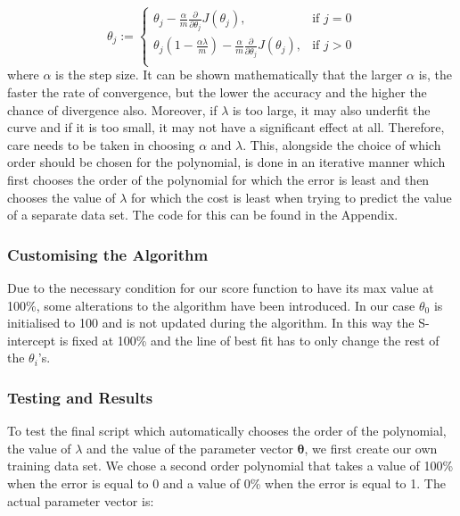 \documentclass[10pt,a4paper]{article}
\begin{document}
\begin{equation}
  \theta_j :=
\begin{cases}
\theta_j  - \frac{\alpha}{m} \frac{\partial}{\partial \theta_j } J( \theta_j), & \text{if }j = 0 \\
\theta_j \left(1- \frac{\alpha\lambda}{m} \right) - \frac{\alpha}{m} \frac{\partial}{\partial \theta_j } J( \theta_j), & \text{if }j > 0 \\
\end{cases}
\end{equation} 
where $\alpha$ is the step size. It can be shown mathematically that the larger $\alpha$ is, the faster the rate of convergence, but the lower the accuracy and the higher the chance of divergence also. Moreover, if $\lambda$ is too large, it may also underfit the curve and if it is too small, it may not have a significant effect at all. Therefore, care needs to be taken in choosing $\alpha$ and $\lambda$. This, alongside the choice of which order should be chosen for the polynomial, is done in an iterative manner which first chooses the order of the polynomial for which the error is least and then chooses the value of $\lambda$ for which the cost is least when trying to predict the value of a separate data set. The code for this can be found in the Appendix.

\subsubsection{Customising the Algorithm}
\noindent
Due to the necessary condition for our score function to have its max value at 100\%, some alterations to the algorithm have been introduced. In our case $\theta_0$ is initialised to 100 and is not updated during the algorithm. In this way the S-intercept is fixed at 100\% and the line of best fit has to only change the rest of the $\theta_i$'s. 

\subsubsection{Testing and Results}
\noindent 
To test the final script which automatically chooses the order of the polynomial, the value of $\lambda$ and the value of the parameter vector $\boldsymbol \theta$, we first create our own training data set. We chose a second order polynomial that takes a value of 100\% when the error is equal to 0 and a value of 0\% when the error is equal to 1.
The actual parameter vector is:
\end{document}
